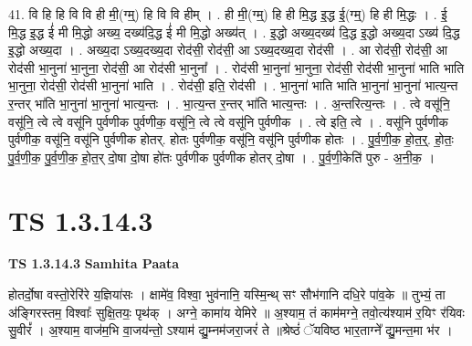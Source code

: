 \documentclass[17pt]{extarticle}
\begin{document}
41. वि हि हि वि वि ही मी॒(ग्म्॒) हि वि वि हीम् । . ही मी॒(ग्म्॒) हि ही मि॒द्ध इ॒द्ध ई॒(ग्म्॒) हि ही मि॒द्धः । . ई॒ मि॒द्ध इ॒द्ध ई॑ मी मि॒द्धो अख्य॒ दख्य॑दि॒द्ध ई॑ मी मि॒द्धो अख्य॑त् । . इ॒द्धो अख्य॒दख्य॑ दि॒द्ध इ॒द्धो अख्य॒दा ऽख्य॑ दि॒द्ध इ॒द्धो अख्य॒दा । . अख्य॒दा ऽख्य॒दख्य॒दा रोद॑सी॒ रोद॑सी॒ आ ऽख्य॒दख्य॒दा रोद॑सी । . आ रोद॑सी॒ रोद॑सी॒ आ रोद॑सी भा॒नुना॑ भा॒नुना॒ रोद॑सी॒ आ रोद॑सी भा॒नुना᳚ । . रोद॑सी भा॒नुना॑ भा॒नुना॒ रोद॑सी॒ रोद॑सी भा॒नुना॑ भाति भाति भा॒नुना॒ रोद॑सी॒ रोद॑सी भा॒नुना॑ भाति । . रोद॑सी॒ इति॒ रोद॑सी । . भा॒नुना॑ भाति भाति भा॒नुना॑ भा॒नुना॑ भात्य॒न्त र॒न्तर् भा॑ति भा॒नुना॑ भा॒नुना॑ भात्य॒न्तः । . भा॒त्य॒न्त र॒न्तर् भा॑ति भात्य॒न्तः । . अ॒न्तरित्य॒न्तः । . त्वे वसू॑नि॒ वसू॑नि॒ त्वे त्वे वसू॑नि पुर्वणीक पुर्वणीक॒ वसू॑नि॒ त्वे त्वे वसू॑नि पुर्वणीक । . त्वे इति॒ त्वे । . वसू॑नि पुर्वणीक पुर्वणीक॒ वसू॑नि॒ वसू॑नि पुर्वणीक होतर्. होतः पुर्वणीक॒ वसू॑नि॒ वसू॑नि पुर्वणीक होतः । . पु॒र्व॒णी॒क॒ हो॒त॒र्॒. हो॒तः॒ पु॒र्व॒णी॒क॒ पु॒र्व॒णी॒क॒ हो॒त॒र् दो॒षा दो॒षा हो॑तः पुर्वणीक पुर्वणीक होतर् दो॒षा । . पु॒र्व॒णी॒केति॑ पुरु - अ॒नी॒क॒ । \newline
\pagebreak
{}
\section*{ TS 1.3.14.3 }

\textbf{TS 1.3.14.3 } \newline
\textbf{Samhita Paata} \newline

होतर्दो॒षा वस्तो॒रेरि॑रे य॒ज्ञिया॑सः । क्षामे॑व॒ विश्वा॒ भुव॑नानि॒ यस्मि॒न्थ् सꣳ सौभ॑गानि दधि॒रे पा॑व॒के ॥ तुभ्यं॒ ता अ॑ङ्गिरस्तम॒ विश्वाः᳚ सुक्षि॒तयः॒ पृथ॑क् । अग्ने॒ कामा॑य येमिरे ॥ अ॒श्याम॒ तं काम॑मग्ने॒ तवो॒त्य॑श्याम॑ र॒यिꣳ र॑यिवः सु॒वीरं᳚ । अ॒श्याम॒ वाज॑म॒भि वा॒जय॑न्तो॒ ऽश्याम॑ द्यु॒म्नम॑जरा॒जरं॑ ते ॥श्रेष्ठं॑ ॅयविष्ठ भार॒ताग्ने᳚ द्यु॒मन्त॒मा भ॑र । \newline
\end{document}
